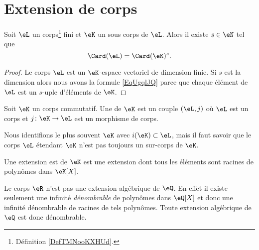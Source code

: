 
\section{Extension de corps}
\label{SECooLQVJooTGeqiR}

\begin{lemma}       \label{LemobATFP}
    Soit \( \eL\) un corps\footnote{Définition \ref{DefTMNooKXHUd}.} fini et \( \eK\) un sous corps de \( \eL\). Alors il existe \( s\in \eN\) tel que
    \begin{equation}        \label{EqUgqlJQ}
        \Card(\eL)=\Card(\eK)^s.
    \end{equation}
\end{lemma}

\begin{proof}
    Le corps \( \eL\) est un \( \eK\)-espace vectoriel de dimension finie. Si \( s\) est la dimension alors nous avons la formule \eqref{EqUgqlJQ} parce que chaque élément de \( \eL\) est un \( s\)-uple d'éléments de \( \eK\).
\end{proof}

\begin{definition}     \label{DEFooFLJJooGJYDOe}
    Soit \( \eK\) un corps commutatif. Une  de \( \eK\) est un couple \( (\eL,j)\) où \( \eL\) est un corps et \( j\colon \eK\to \eL\) est un morphisme de corps.
\end{definition}

    Nous identifions le plus souvent \( \eK\) avec \( i(\eK)\subset \eL\), mais il faut savoir que le corps \( \eL\) étendant \( \eK\) n'est pas toujours un sur-corps de \( \eK\).

\begin{definition}      \label{DEFooREUHooLVwRuw}
    Une extension est  de \( \eK\) est une extension dont tous les éléments sont racines de polynômes dans \( \eK[X]\).
\end{definition}

\begin{example}
    Le corps \( \eR\) n'est pas une extension algébrique de \( \eQ\). En effet il existe seulement une infinité \emph{dénombrable} de polynômes dans \( \eQ[X]\) et donc une infinité dénombrable de racines de tels polynômes. Toute extension algébrique de \( \eQ\) est donc dénombrable.
\end{example}

